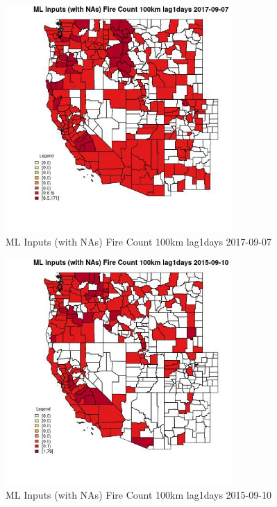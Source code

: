 \begin{figure} 
\centering  
\includegraphics[width=0.77\textwidth]{Code_Outputs/Report_ML_input_PM25_Step4_part_e_de_duplicated_aves_compiled_2019-05-21wNAs_CountyFire_Count_100km_lag1daysMean2017-09-07.jpg} 
\caption{\label{fig:Report_ML_input_PM25_Step4_part_e_de_duplicated_aves_compiled_2019-05-21wNAsCountyFire_Count_100km_lag1daysMean2017-09-07}ML Inputs (with NAs) Fire Count 100km lag1days 2017-09-07} 
\end{figure} 
 

\begin{figure} 
\centering  
\includegraphics[width=0.77\textwidth]{Code_Outputs/Report_ML_input_PM25_Step4_part_e_de_duplicated_aves_compiled_2019-05-21wNAs_CountyFire_Count_100km_lag1daysMean2015-09-10.jpg} 
\caption{\label{fig:Report_ML_input_PM25_Step4_part_e_de_duplicated_aves_compiled_2019-05-21wNAsCountyFire_Count_100km_lag1daysMean2015-09-10}ML Inputs (with NAs) Fire Count 100km lag1days 2015-09-10} 
\end{figure} 
 

